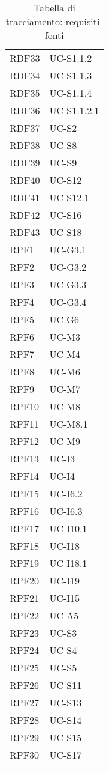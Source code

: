 \begin{longtable}{| p{5cm} | p{5cm} |}
		\rowcolor{LightGray}
		RDF33 & UC-S1.1.2\\
		RDF34 & UC-S1.1.3\\%
		RDF35 & UC-S1.1.4\\		%
		RDF36 & UC-S1.1.2.1 \\
		\rowcolor{LightGray}
		RDF37 & UC-S2\\
		RDF38 & UC-S8\\
		\rowcolor{LightGray}
		RDF39 & UC-S9\\
		\rowcolor{LightGray}
		RDF40 & UC-S12 \\
		RDF41 & UC-S12.1 \\
		\rowcolor{LightGray}
		RDF42 & UC-S16\\
		RDF43 & UC-S18\\		%
		RPF1 & UC-G3.1\\
		\rowcolor{LightGray}
		RPF2 & UC-G3.2\\
		RPF3 & UC-G3.3\\
		\rowcolor{LightGray}
		RPF4 & UC-G3.4\\
		RPF5 & UC-G6\\
		\rowcolor{LightGray}
		RPF6 & UC-M3\\
		RPF7 & UC-M4\\
		\rowcolor{LightGray}
		RPF8 & UC-M6\\
		RPF9 & UC-M7\\
		\rowcolor{LightGray}
		RPF10 & UC-M8\\
		RPF11 & UC-M8.1\\
		\rowcolor{LightGray}
		RPF12 & UC-M9\\
		RPF13 & UC-I3\\
		\rowcolor{LightGray}
		RPF14 & UC-I4\\
		RPF15 & UC-I6.2\\
		\rowcolor{LightGray}
		RPF16 & UC-I6.3\\
		RPF17 & UC-I10.1\\
		\rowcolor{LightGray}
		RPF18 & UC-I18\\
		RPF19 & UC-I18.1\\
		\rowcolor{LightGray}
		RPF20 & UC-I19\\	
		RPF21 & UC-I15\\
		\rowcolor{LightGray}
		RPF22 & UC-A5\\
		RPF23 & UC-S3\\
		\rowcolor{LightGray}
		RPF24 & UC-S4\\
		RPF25 & UC-S5\\
		\rowcolor{LightGray}
		RPF26 & UC-S11\\
		RPF27 & UC-S13\\
		\rowcolor{LightGray}
		RPF28 & UC-S14\\	
		RPF29 & UC-S15\\
		\rowcolor{LightGray}
		RPF30 & UC-S17\\
		\hline
		\caption{Tabella di tracciamento: requisiti-fonti}
\end{longtable}

